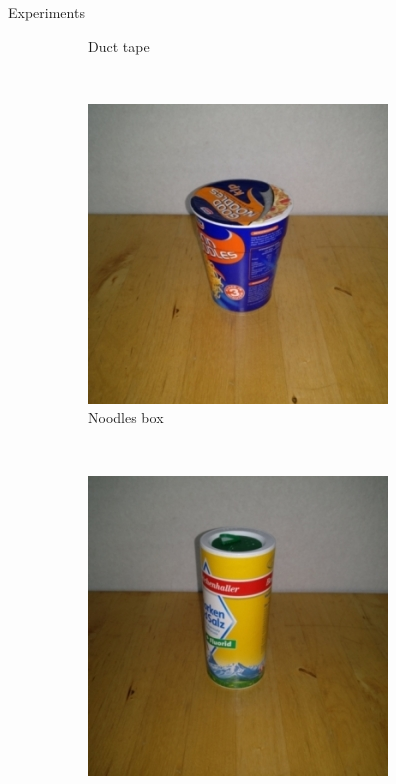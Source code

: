 \documentclass{beamer}
\begin{document}
\begin{frame}{Experiments}
\begin{figure}[t]
\begin{subfigure}[t]{0.23\textwidth}
        \caption{\scriptsize Duct tape}
        \label{fig:object_duct_tape}
    \end{subfigure}
    ~
    \begin{subfigure}[t]{0.23\textwidth}
        \includegraphics[width=\textwidth]{object_noodle_box}
        \caption{\scriptsize Noodles box}
        \label{fig:object_noodle_box}
    \end{subfigure}
    ~
    \begin{subfigure}[t]{0.23\textwidth}
        \includegraphics[width=\textwidth]{object_salt}

\end{subfigure}
\end{figure}
\end{frame}
\end{document}
